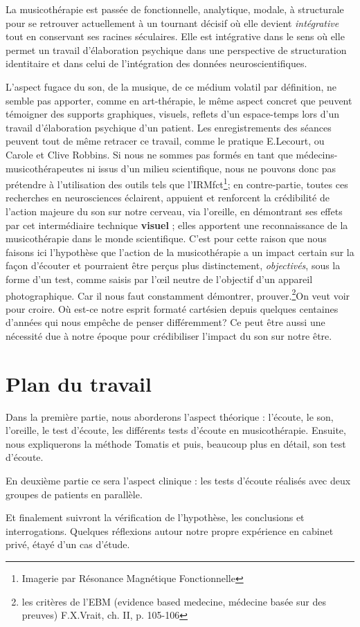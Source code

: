  \autocite[ch. III, p. 96]{vrait_musicotherapie_2018} La musicothérapie est passée de fonctionnelle, analytique, modale,  à structurale pour se retrouver actuellement 
 à un tournant décisif où elle devient 
 \emph{intégrative} tout en conservant ses racines séculaires. Elle est intégrative dans le sens où elle permet un travail d'élaboration psychique dans une perspective de structuration identitaire \autocite[ch. III, p. 53, 105]{vrait_musicotherapie_2018} et dans celui de l'intégration des données neuroscientifiques.
 
  
L'aspect fugace du son, de la musique, de ce médium volatil par
définition, ne semble pas apporter, comme en art-thérapie, le
même aspect concret que peuvent témoigner des supports graphiques,
visuels, reflets d'un espace-temps lors d'un travail d'élaboration
psychique d'un patient. Les enregistrements des séances peuvent tout de même retracer ce travail, comme le pratique E.Lecourt, ou Carole et Clive Robbins.
Si nous ne sommes pas formés en tant que médecins- musicothérapeutes ni issus d'un milieu scientifique, nous ne pouvons donc  pas prétendre à l'utilisation des outils
 tels que l'IRMfct\footnote{Imagerie par Résonance Magnétique Fonctionnelle}; en contre-partie, toutes ces recherches en
neurosciences éclairent, appuient et renforcent la crédibilité de l'action
majeure du son sur notre cerveau, via l'oreille, en démontrant ses effets par cet intermédiaire technique \textbf{visuel} ; elles apportent une reconnaissance de la musicothérapie dans le monde scientifique. C'est pour cette raison que nous  faisons ici l'hypothèse que l'action de la musicothérapie a un impact certain sur la façon d'écouter et pourraient être perçus plus
distinctement, \textsl{objectivés}, sous la forme d'un test, comme saisis par l'\oe il neutre de l'objectif d'un appareil
photographique.
Car il nous faut constamment démontrer, prouver.\footnote{
	les critères de l'EBM (evidence based medecine, médecine basée sur des preuves) F.X.Vrait, ch. II, p. 105-106 }On veut voir pour croire. Où est-ce notre esprit formaté cartésien depuis quelques centaines d'années qui nous empêche de penser différemment? 
Ce peut être aussi une nécessité due à notre époque pour crédibiliser l'impact du son sur notre être. 


\section{Plan du travail}

Dans la première partie, nous aborderons l'aspect théorique : l'écoute, le son, l'oreille, le test d'écoute, les différents tests d'écoute en musicothérapie.  Ensuite, nous expliquerons  la méthode Tomatis
et puis, beaucoup plus en détail, son test d'écoute.

En deuxième partie ce sera l'aspect clinique : les tests d'écoute réalisés  avec deux groupes de patients en parallèle.

Et finalement suivront la vérification de l'hypothèse, les conclusions et interrogations. 
Quelques réflexions autour notre propre expérience en cabinet privé, étayé d'un cas d'étude.
